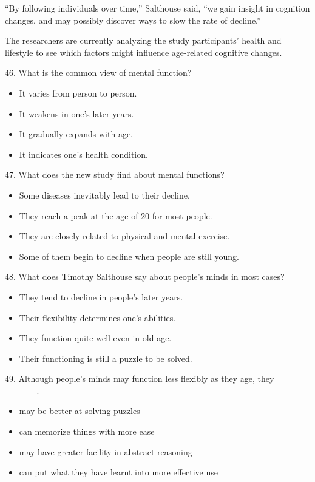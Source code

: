 \documentclass[UTF8,11pt]{ctexart}
\begin{document}
“By following individuals over time,” Salthouse said, “we gain insight in cognition changes, and may possibly discover ways to slow the rate of decline.”


The researchers are currently analyzing the study participants’ health and lifestyle to see which factors might influence age-related cognitive changes.


46. What is the common view of mental function?


\begin{itemize}[leftmargin=2em,itemsep=.2em,topsep=.4em]\item[A.] It varies from person to person.
\item[B.] It weakens in one’s later years.
\item[C.] It gradually expands with age.
\item[D.] It indicates one’s health condition.
\end{itemize}

47. What does the new study find about mental functions?


\begin{itemize}[leftmargin=2em,itemsep=.2em,topsep=.4em]\item[A.] Some diseases inevitably lead to their decline.
\item[B.] They reach a peak at the age of 20 for most people.
\item[C.] They are closely related to physical and mental exercise.
\item[D.] Some of them begin to decline when people are still young.
\end{itemize}

48. What does Timothy Salthouse say about people’s minds in most cases?


\begin{itemize}[leftmargin=2em,itemsep=.2em,topsep=.4em]\item[A.] They tend to decline in people’s later years.
\item[B.] Their flexibility determines one’s abilities.
\item[C.] They function quite well even in old age.
\item[D.] Their functioning is still a puzzle to be solved.
\end{itemize}

49. Although people’s minds may function less flexibly as they age, they \_\_\_\_\_.


\begin{itemize}[leftmargin=2em,itemsep=.2em,topsep=.4em]\item[A.] may be better at solving puzzles
\item[B.] can memorize things with more ease
\item[C.] may have greater facility in abstract reasoning
\item[D.] can put what they have learnt into more effective use
\end{itemize}
\end{document}
